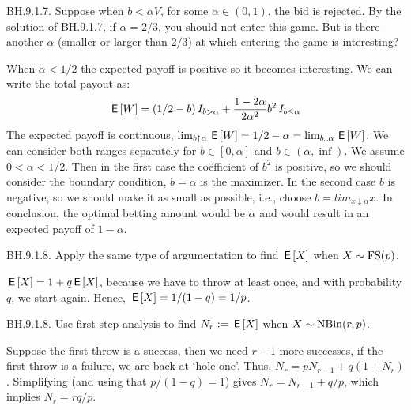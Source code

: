 \begin{exercise}
  BH.9.1.7. Suppose when $b<\alpha V$, for some $\alpha\in(0,1)$, the bid is rejected.
By the solution of BH.9.1.7, if $\alpha=2/3$, you should not enter this game.
But is there another $\alpha$ (smaller or larger than $2/3$) at which entering the game is interesting?
\begin{solution}
  When $\alpha < 1/2$ the expected payoff is positive so it becomes interesting. We can write the total payout as:
 \begin{align*}
   \,\mathsf{E}\left[W\right] &= (1/2 - b) \,I_{b>\alpha} + \frac{1-2\alpha}{2\alpha^2}b^2 \,I_{b\leq \alpha} \\
  \end{align*}
  The expected payoff is continuous, $\lim_{b\uparrow \alpha} \,\mathsf{E}\left[W\right]  = 1/2 - \alpha = \lim_{b\downarrow \alpha} \,\mathsf{E}\left[W\right]$. We can consider both ranges separately for $b \in [0,\alpha]$ and $b \in (\alpha, \inf)$. We assume $0<\alpha<1/2$. Then in the first case the co\"efficient of $b^2$ is positive, so we should consider the boundary condition, $b=\alpha$ is the maximizer. In the second case $b$ is negative, so we should make it as small as possible, i.e., choose $b = lim_{x \downarrow \alpha} x$. In conclusion, the optimal betting amount would be $\alpha$ and would result in an expected payoff of $1-\alpha$.
\end{solution}
\end{exercise}

\begin{exercise}
BH.9.1.8. Apply the same type of argumentation to find $\,\mathsf{E}\left[X\right]$ when $X\sim \mathrm{FS}(p)$.
\begin{hint}
\end{hint}
\begin{solution}
$\,\mathsf{E}\left[X\right] = 1 + q\,\mathsf{E}\left[X\right]$, because we have to throw at least once, and with probability $q$, we start again. Hence, $\,\mathsf{E}\left[X\right] = 1/(1-q) = 1/p$.
\end{solution}
\end{exercise}

\begin{exercise}
BH.9.1.8. Use first step analysis to  find $N_{r} := \,\mathsf{E}\left[X\right]$ when $X\sim \mathrm{NBin}(r,p)$.
\begin{solution}
Suppose the first throw is a success, then we need $r-1$ more successes, if the first throw is a failure, we are back at `hole one'. Thus, $N_{r} = p N_{r-1}+q(1+N_{r})$. Simplifying (and using that $p/(1-q)=1$) gives $N_{r} = N_{r-1} + q/p$, which implies $N_{r} = r q/p$.
\end{solution}
\end{exercise}

